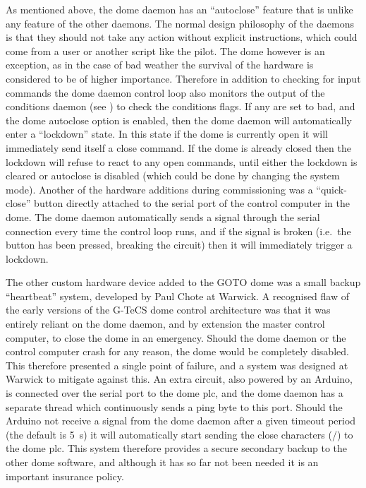 \begin{colsection}
\begin{colsection}
As mentioned above, the dome daemon has an ``autoclose'' feature that is unlike any feature of the other daemons. The normal design philosophy of the daemons is that they should not take any action without explicit instructions, which could come from a user or another script like the pilot. The dome however is an exception, as in the case of bad weather the survival of the hardware is considered to be of higher importance. Therefore in addition to checking for input commands the dome daemon control loop also monitors the output of the conditions daemon (see ) to check the conditions flags. If any are set to bad, and the dome autoclose option is enabled, then the dome daemon will automatically enter a ``lockdown'' state. In this state if the dome is currently open it will immediately send itself a close command. If the dome is already closed then the lockdown will refuse to react to any open commands, until either the lockdown is cleared or autoclose is disabled (which could be done by changing the system mode). Another of the hardware additions during commissioning was a ``quick-close'' button directly attached to the serial port of the control computer in the dome. The dome daemon automatically sends a signal through the serial connection every time the control loop runs, and if the signal is broken (i.e.\ the button has been pressed, breaking the circuit) then it will immediately trigger a lockdown.

The other custom hardware device added to the GOTO dome was a small backup ``heartbeat'' system, developed by Paul Chote at Warwick. A recognised flaw of the early versions of the G-TeCS dome control architecture was that it was entirely reliant on the dome daemon, and by extension the master control computer, to close the dome in an emergency. Should the dome daemon or the control computer crash for any reason, the dome would be completely disabled. This therefore presented a single point of failure, and a system was designed at Warwick to mitigate against this. An extra circuit, also powered by an Arduino, is connected over the serial port to the dome \gls{plc}, and the dome daemon has a separate thread which continuously sends a ping byte to this port. Should the Arduino not receive a signal from the dome daemon after a given timeout period (the default is \SI{5}{\second}) it will automatically start sending the close characters (/) to the dome \gls{plc}. This system therefore provides a secure secondary backup to the other dome software, and although it has so far not been needed it is an important insurance policy.


\end{colsection}
\end{colsection}
